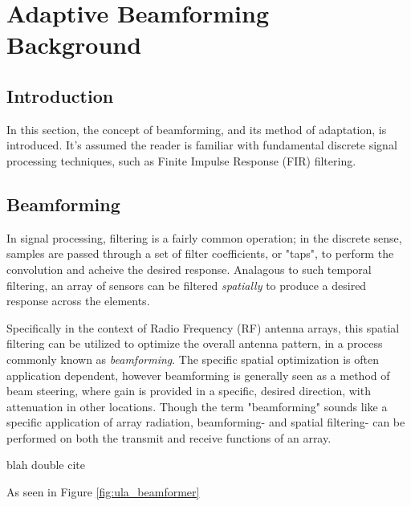 \chapter{Adaptive Beamforming Background}
\label{chap:abf_background}

\section{Introduction}

In this section, the concept of beamforming, and its method of adaptation, is introduced. It's assumed the reader is familiar with fundamental discrete signal processing techniques, such as Finite Impulse Response (FIR) filtering.

\section{Beamforming}

In signal processing, filtering is a fairly common operation; in the discrete sense, samples are passed through a set of filter coefficients, or "taps", to perform the convolution and acheive the desired response. Analagous to such temporal filtering, an array of sensors can be filtered \emph{spatially} to produce a desired response across the elements.

Specifically in the context of Radio Frequency (RF) antenna arrays, this spatial filtering can be utilized to optimize the overall antenna pattern, in a process commonly known as \emph{beamforming}\citep{van_veen_and_buckley}. The specific spatial optimization is often application dependent, however beamforming is generally seen as a method of beam steering, where gain is provided in a specific, desired direction, with attenuation in other locations. Though the term "beamforming" sounds like a specific application of array radiation, beamforming- and spatial filtering- can be performed on both the transmit and receive functions of an array.

blah double cite \citep{Alexander_and_Ghirnikar,Haykin}

As seen in Figure \ref{fig:ula_beamformer}

